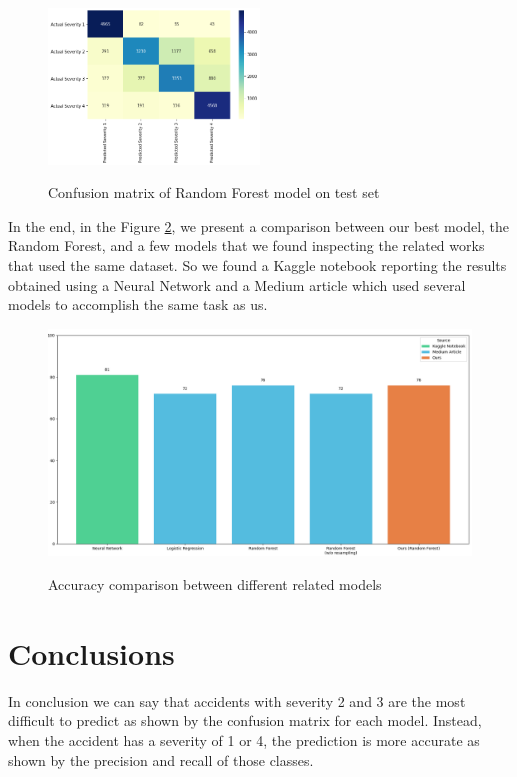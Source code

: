 \documentclass{article}
\begin{document}
\begin{figure}[h!]
\centering
\includegraphics[width=0.5\textwidth]{best-model-testset}
\label{img:conf-matrix}
\caption{Confusion matrix of Random Forest model on test set}
\end{figure}

In the end, in the Figure \ref{img:acc-comp}, we present a comparison between our best model, the Random Forest, and a few models that we found inspecting the related works that used the same dataset.
So we found a Kaggle notebook reporting the results obtained using a Neural Network and a Medium article which used several models to accomplish the same task as us.

\begin{figure}[h!]
\centering
\includegraphics[width=\textwidth]{accuracy-comparison}
\label{img:acc-comp}
\caption{Accuracy comparison between different related models}
\end{figure}

\section{Conclusions}

In conclusion we can say that accidents with severity 2 and 3 are the most difficult to predict as shown by the confusion matrix for each model. Instead, when the accident has a severity of 1 or 4, the prediction is more accurate as shown by the precision and recall of those classes.
\end{document}
